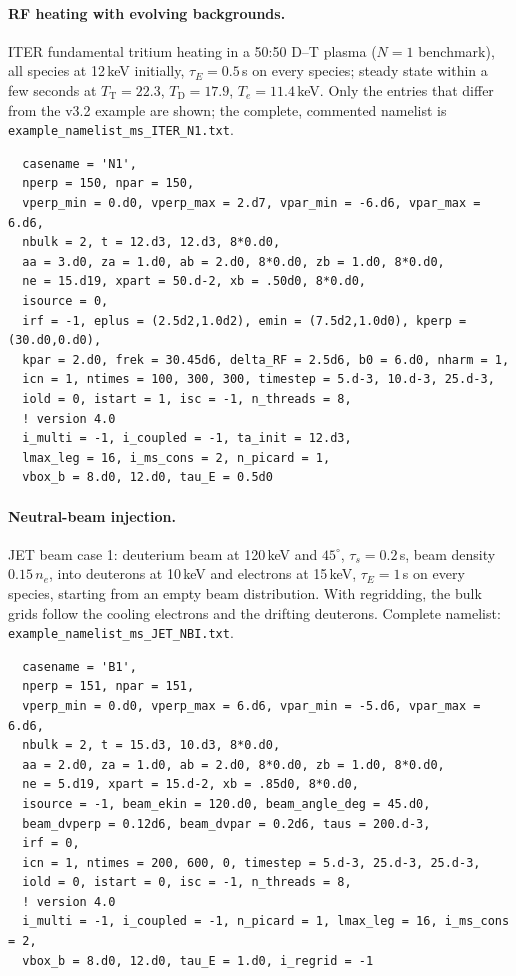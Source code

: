 \documentclass[11pt,a4paper]{article}
\begin{document}
\paragraph{RF heating with evolving backgrounds.}  ITER fundamental tritium heating in a 50:50 D--T
plasma ($N=1$ benchmark), all species at 12\,keV initially, $\tau_E=0.5$\,s on every species; steady
state within a few seconds at $T_\mathrm T=22.3$, $T_\mathrm D=17.9$, $T_e=11.4$\,keV.  Only the entries that
differ from the v3.2 example are shown; the complete, commented namelist is
\texttt{example\_namelist\_ms\_ITER\_N1.txt}.
\begin{lstlisting}
  casename = 'N1',
  nperp = 150, npar = 150,
  vperp_min = 0.d0, vperp_max = 2.d7, vpar_min = -6.d6, vpar_max = 6.d6,
  nbulk = 2, t = 12.d3, 12.d3, 8*0.d0,
  aa = 3.d0, za = 1.d0, ab = 2.d0, 8*0.d0, zb = 1.d0, 8*0.d0,
  ne = 15.d19, xpart = 50.d-2, xb = .50d0, 8*0.d0,
  isource = 0,
  irf = -1, eplus = (2.5d2,1.0d2), emin = (7.5d2,1.0d0), kperp = (30.d0,0.d0),
  kpar = 2.d0, frek = 30.45d6, delta_RF = 2.5d6, b0 = 6.d0, nharm = 1,
  icn = 1, ntimes = 100, 300, 300, timestep = 5.d-3, 10.d-3, 25.d-3,
  iold = 0, istart = 1, isc = -1, n_threads = 8,
  ! version 4.0
  i_multi = -1, i_coupled = -1, ta_init = 12.d3,
  lmax_leg = 16, i_ms_cons = 2, n_picard = 1,
  vbox_b = 8.d0, 12.d0, tau_E = 0.5d0
\end{lstlisting}

\paragraph{Neutral-beam injection.}  JET beam case 1: deuterium beam at 120\,keV and $45^\circ$,
$\tau_s=0.2$\,s, beam density $0.15\,n_e$, into deuterons at 10\,keV and electrons at 15\,keV,
$\tau_E=1$\,s on every species, starting from an empty beam distribution.  With regridding, the bulk
grids follow the cooling electrons and the drifting deuterons.  Complete namelist:
\texttt{example\_namelist\_ms\_JET\_NBI.txt}.
\begin{lstlisting}
  casename = 'B1',
  nperp = 151, npar = 151,
  vperp_min = 0.d0, vperp_max = 6.d6, vpar_min = -5.d6, vpar_max = 6.d6,
  nbulk = 2, t = 15.d3, 10.d3, 8*0.d0,
  aa = 2.d0, za = 1.d0, ab = 2.d0, 8*0.d0, zb = 1.d0, 8*0.d0,
  ne = 5.d19, xpart = 15.d-2, xb = .85d0, 8*0.d0,
  isource = -1, beam_ekin = 120.d0, beam_angle_deg = 45.d0,
  beam_dvperp = 0.12d6, beam_dvpar = 0.2d6, taus = 200.d-3,
  irf = 0,
  icn = 1, ntimes = 200, 600, 0, timestep = 5.d-3, 25.d-3, 25.d-3,
  iold = 0, istart = 0, isc = -1, n_threads = 8,
  ! version 4.0
  i_multi = -1, i_coupled = -1, n_picard = 1, lmax_leg = 16, i_ms_cons = 2,
  vbox_b = 8.d0, 12.d0, tau_E = 1.d0, i_regrid = -1
\end{lstlisting}
\end{document}
